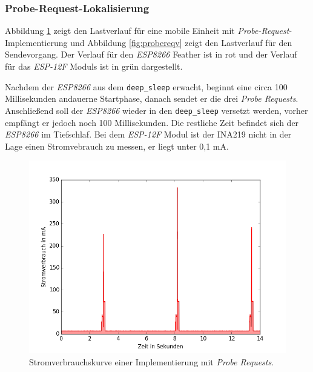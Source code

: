 \subsubsection{Probe-Request-Lokalisierung}
\label{ch:phase2:sec:powerprobereq}
Abbildung \ref{fig:probereqfull} zeigt den Lastverlauf für eine mobile Einheit mit \emph{Probe-Request}-Implementierung und Abbildung \ref{fig:probereqv} zeigt den Lastverlauf für den Sendevorgang. 
Der Verlauf für den \emph{ESP8266} Feather ist in rot und der Verlauf für das \emph{ESP-12F} Moduls ist in grün dargestellt.

Nachdem der \emph{ESP8266} aus dem \texttt{deep\_sleep} erwacht, beginnt eine circa 100 Millisekunden andauerne Startphase, danach sendet er die drei \emph{Probe Requests}.
Anschließend soll der \emph{ESP8266} wieder in den \texttt{deep\_sleep} versetzt werden, vorher empfängt er jedoch noch 100 Millisekunden.
Die restliche Zeit befindet sich der \emph{ESP8266} im Tiefschlaf. 
Bei dem \emph{ESP-12F} Modul ist der INA219 nicht in der Lage einen Stromvebrauch zu messen, er liegt unter 0,1 mA.

\begin{figure}[h!]
  \centering
	\includegraphics[width=\textwidth]{plots/probereqfull.png}
  \caption{Stromverbrauchskurve einer Implementierung mit \emph{Probe Requests}.}
  \label{fig:probereqfull}
\end{figure}

